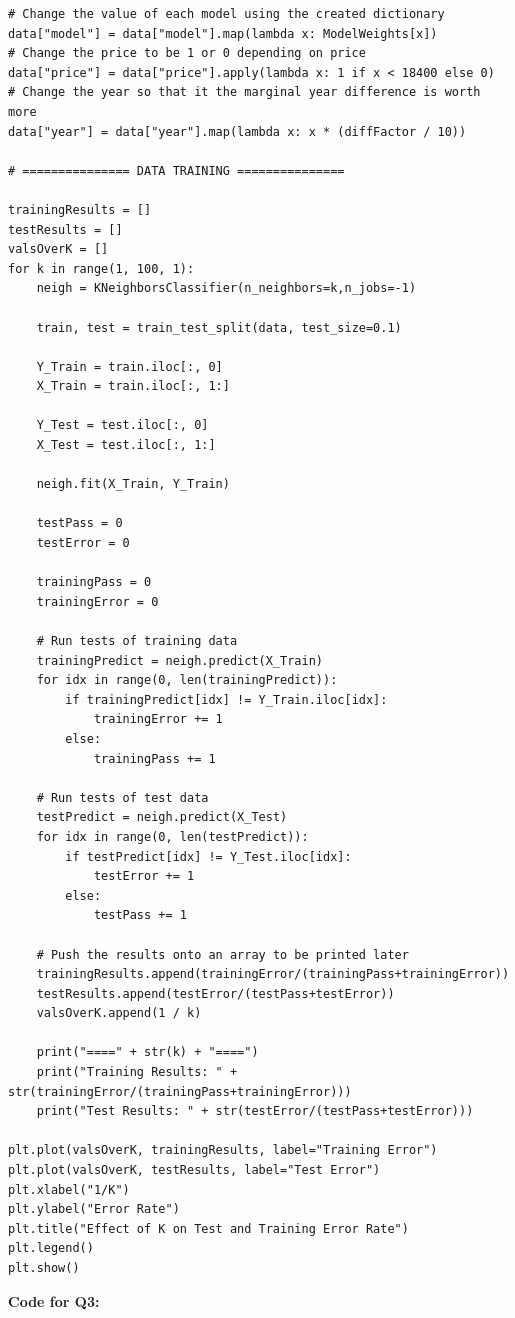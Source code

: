 \documentclass{article}
\begin{document}
\begin{lstlisting}
# Change the value of each model using the created dictionary
data["model"] = data["model"].map(lambda x: ModelWeights[x])
# Change the price to be 1 or 0 depending on price
data["price"] = data["price"].apply(lambda x: 1 if x < 18400 else 0)
# Change the year so that it the marginal year difference is worth more
data["year"] = data["year"].map(lambda x: x * (diffFactor / 10))

# =============== DATA TRAINING ===============

trainingResults = []
testResults = []
valsOverK = []
for k in range(1, 100, 1):
    neigh = KNeighborsClassifier(n_neighbors=k,n_jobs=-1)

    train, test = train_test_split(data, test_size=0.1)

    Y_Train = train.iloc[:, 0]
    X_Train = train.iloc[:, 1:]

    Y_Test = test.iloc[:, 0]
    X_Test = test.iloc[:, 1:]

    neigh.fit(X_Train, Y_Train)

    testPass = 0
    testError = 0

    trainingPass = 0
    trainingError = 0

    # Run tests of training data
    trainingPredict = neigh.predict(X_Train)
    for idx in range(0, len(trainingPredict)):
        if trainingPredict[idx] != Y_Train.iloc[idx]:
            trainingError += 1
        else:
            trainingPass += 1

    # Run tests of test data
    testPredict = neigh.predict(X_Test)
    for idx in range(0, len(testPredict)):
        if testPredict[idx] != Y_Test.iloc[idx]:
            testError += 1
        else:
            testPass += 1

    # Push the results onto an array to be printed later
    trainingResults.append(trainingError/(trainingPass+trainingError))
    testResults.append(testError/(testPass+testError))
    valsOverK.append(1 / k)

    print("====" + str(k) + "====")
    print("Training Results: " + str(trainingError/(trainingPass+trainingError)))
    print("Test Results: " + str(testError/(testPass+testError)))

plt.plot(valsOverK, trainingResults, label="Training Error")
plt.plot(valsOverK, testResults, label="Test Error")
plt.xlabel("1/K")
plt.ylabel("Error Rate")
plt.title("Effect of K on Test and Training Error Rate")
plt.legend()
plt.show()
\end{lstlisting}
\newpage
\textbf{Code for Q3:}
\end{document}

